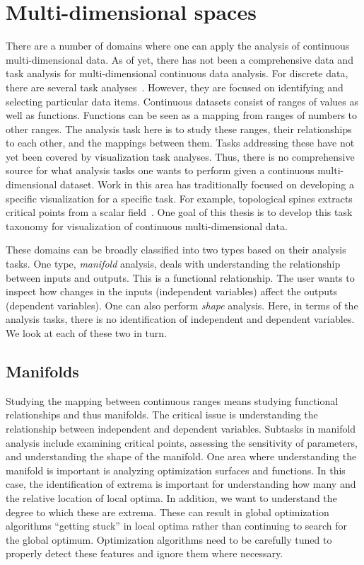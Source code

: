 
\section{Multi-dimensional spaces}
\label{sec:motivation:multi-d}

There are a number of domains where one can apply the analysis of continuous
multi-dimensional data.  As of yet, there has not been a comprehensive data and
task analysis for multi-dimensional continuous data analysis. For discrete
data, there are several task 
analyses~\cite{Shneiderman:1996,Brehmer:2013,Amar:2004}. 
However, they are
focused on identifying and selecting particular data items. Continuous datasets
consist of ranges of values as well as functions. Functions can be seen as a
mapping from ranges of numbers to other ranges. The analysis task here is to
study these ranges, their relationships to each other, and the mappings between
them. Tasks addressing these
have not yet been covered by visualization task analyses. Thus,
there is no comprehensive source for what analysis tasks one wants to perform
given a continuous multi-dimensional dataset.  Work in this area has
traditionally focused on developing a specific visualization for a specific
task. For example, topological spines extracts critical points from a scalar
field~\cite{Correa:2011}. One goal of this thesis is to develop this task
taxonomy for visualization of continuous multi-dimensional data.


These domains can be broadly classified into two types based on their analysis
tasks. One type, \emph{manifold} analysis, deals with understanding the
relationship between inputs and outputs. This is a functional relationship.
The user wants to inspect how changes in the inputs (independent variables)
affect the outputs (dependent variables). One can also perform \emph{shape}
analysis. Here, in terms of the analysis tasks, there is no identification of
independent and dependent variables. We look at each of these two in turn.

\subsection{Manifolds}
\label{sec:manifolds}

Studying the mapping between continuous ranges means studying functional
relationships and thus manifolds.  The critical issue is understanding the
relationship between independent and dependent variables.  Subtasks in manifold
analysis include examining critical points, assessing the sensitivity of
parameters, and understanding the shape of the manifold.  
One area where
understanding the manifold is important is analyzing optimization surfaces and
functions.  In this case, the identification of extrema is important for
understanding how many and the relative location of local optima. In addition,
we want to understand the degree to which these are extrema. These can result
in global optimization algorithms ``getting stuck'' in local optima rather than
continuing to search for the global optimum. Optimization algorithms need to be
carefully tuned to properly detect these features and ignore them where
necessary.

